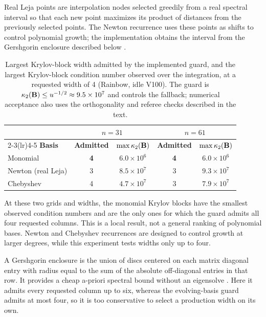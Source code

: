 Real Leja points are interpolation nodes selected greedily from a real spectral interval so that each new point maximizes its product of distances from the previously selected points. The Newton recurrence uses these points as shifts to control polynomial growth; the implementation obtains the interval from the Gershgorin enclosure described below \cite{caliari-2016}.
\begin{table}[htbp!]
\centering
\caption{Largest Krylov-block width admitted by the implemented guard, and the largest Krylov-block
condition number observed over the integration, at a requested width of 4 (Rainbow, idle
V100). The guard is $\kappa_2(\mathbf{B})\le u^{-1/2}\approx9.5\times10^7$ and controls the
fallback; numerical acceptance also uses the orthogonality and referee checks described in the
text.}
\label{tab:ca-guard}
\begin{tabular}{@{}lcccc@{}}
\toprule
& \multicolumn{2}{c}{$n = 31$} & \multicolumn{2}{c}{$n = 61$} \\
\cmidrule(lr){2-3}\cmidrule(lr){4-5}
\textbf{Basis} & \textbf{Admitted} & $\max \kappa_2(\mathbf{B})$ & \textbf{Admitted} & $\max \kappa_2(\mathbf{B})$ \\
\midrule
Monomial  & \textbf{4} & $6.0\times10^{6}$ & \textbf{4} & $6.0\times10^{6}$ \\
Newton (real Leja) & 3 & $8.5\times10^{7}$ & 3 & $9.3\times10^{7}$ \\
Chebyshev & 4 & $4.7\times10^{7}$ & 3 & $7.9\times10^{7}$ \\
\bottomrule
\end{tabular}
\end{table}

At these two grids and widths, the monomial Krylov blocks have the smallest observed condition numbers and are the only ones for which the guard admits all four requested columns. This is a local result, not a general ranking of polynomial bases. Newton and Chebyshev recurrences are designed to control growth at larger degrees, while this experiment tests widths only up to four.

A Gershgorin enclosure is the union of discs centered on each matrix diagonal entry with radius equal to the sum of the absolute off-diagonal entries in that row. It provides a cheap a-priori spectral bound without an eigensolve \cite{golub-vanloan-2013}. Here it admits every requested column up to six, whereas the evolving-basis guard admits at most four, so it is too conservative to select a production width on its own.

